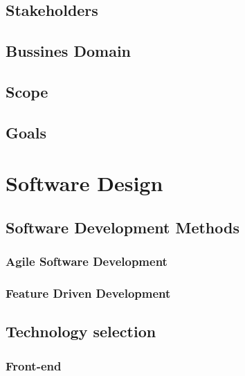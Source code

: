 \documentclass{article}
\begin{document}
        \subsection{Stakeholders}
        

        \subsection{Bussines Domain}
        

        \subsection{Scope}
        
    
        \subsection{Goals}
        
\pagebreak

\section{Software Design}
    \subsection{Software Development Methods}
    
        \subsubsection{Agile Software Development}
        
        \subsubsection{Feature Driven Development}
                
        \pagebreak
    \subsection{Technology selection}
    
            \subsubsection{Front-end}
                        
\end{document}
